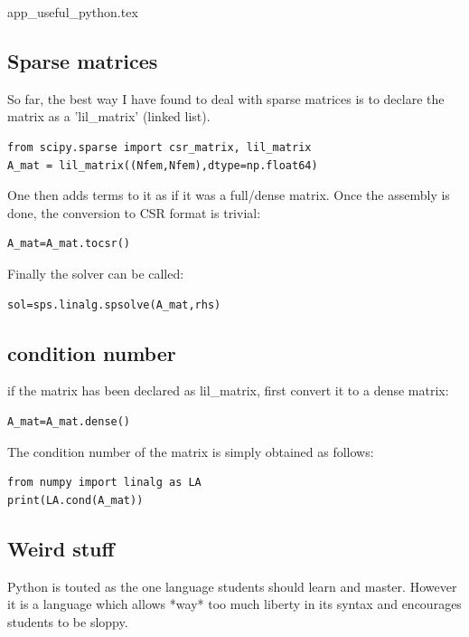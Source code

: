 \begin{flushright} {\tiny {\color{gray} app\_useful\_python.tex}} \end{flushright}

\subsection{Sparse matrices}

So far, the best way I have found to deal with sparse matrices is to 
declare the matrix as a 'lil\_matrix' (linked list).

\begin{lstlisting}
from scipy.sparse import csr_matrix, lil_matrix
A_mat = lil_matrix((Nfem,Nfem),dtype=np.float64)
\end{lstlisting}

One then adds terms to it as if it was a full/dense matrix. 
Once the assembly is done, the conversion to CSR format is trivial:

\begin{lstlisting}
A_mat=A_mat.tocsr()
\end{lstlisting}

Finally the solver can be called:

\begin{lstlisting}
sol=sps.linalg.spsolve(A_mat,rhs)
\end{lstlisting}

\subsection{condition number}

if the matrix has been declared as lil\_matrix, first convert it to a dense matrix:
\begin{lstlisting}
A_mat=A_mat.dense()
\end{lstlisting}
The condition number of the matrix is simply obtained as follows:
\begin{lstlisting}
from numpy import linalg as LA
print(LA.cond(A_mat))
\end{lstlisting}

\subsection{Weird stuff}

Python is touted as the one language students should learn and master. However it is a language which allows *way* too much liberty in its syntax and encourages students to be sloppy. 

